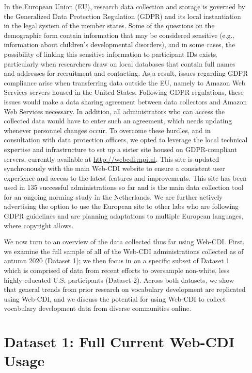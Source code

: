\documentclass[
  english,
  ,man,floatsintext]{apa6}
\begin{document}
In the European Union (EU), research data collection and storage is governed by the Generalized Data Protection Regulation (GDPR) and its local instantiation in the legal system of the member states. Some of the questions on the demographic form contain information that may be considered sensitive (e.g., information about children's developmental disorders), and in some cases, the possibility of linking this sensitive information to participant IDs exists, particularly when researchers draw on local databases that contain full names and addresses for recruitment and contacting. As a result, issues regarding GDPR compliance arise when transferring data outside the EU, namely to Amazon Web Services servers housed in the United States. Following GDPR regulations, these issues would make a data sharing agreement between data collectors and Amazon Web Services necessary. In addition, all administrators who can access the collected data would have to enter such an agreement, which needs updating whenever personnel changes occur. To overcome these hurdles, and in consultation with data protection officers, we opted to leverage the local technical expertise and infrastructure to set up a sister site housed on GDPR-compliant servers, currently available at \url{http://webcdi.mpi.nl}. This site is updated synchronously with the main Web-CDI website to ensure a consistent user experience and access to the latest features and improvements. This site has been used in 135 successful administrations so far and is the main data collection tool for an ongoing norming study in the Netherlands. We are further actively advertising the option to use the European site to other labs who are following GDPR guidelines and are planning adaptations to multiple European languages, where copyright allows.

We now turn to an overview of the data collected thus far using Web-CDI. First, we examine the full sample of all of the Web-CDI administrations collected as of autumn 2020 (Dataset 1); we then focus in on a specific subset of Dataset 1 which is comprised of data from recent efforts to oversample non-white, less highly-educated U.S. participants (Dataset 2). Across both datasets, we show that general trends from prior research on vocabulary development are replicated using Web-CDI, and we discuss the potential for using Web-CDI to collect vocabulary development data from diverse communities online.

\hypertarget{dataset-1-full-current-web-cdi-usage}{%
\section{Dataset 1: Full Current Web-CDI Usage}\label{dataset-1-full-current-web-cdi-usage}}
\end{document}

